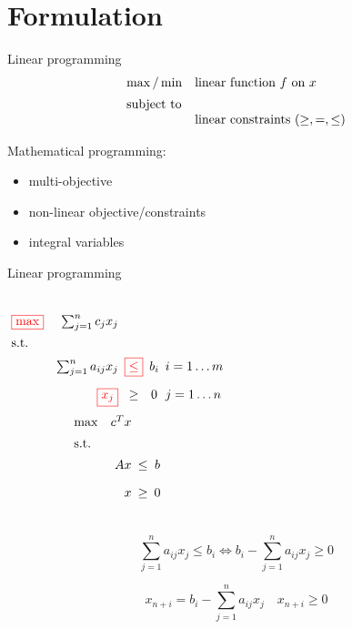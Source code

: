 \section{Formulation}

\begin{frame}{Linear programming}
  \begin{equation*}
	\setlength\arraycolsep{2.5pt}
	\begin{array}{l@{\quad}l}
	  \max/\min 	& \text{linear function } f \text{ on } x	\\[5pt]
	  \text{subject to} 	&	\\
					&	\text{linear constraints } (\geq, =, \leq)
	\end{array}
  \end{equation*}

  \vspace{0.80cm}

  Mathematical programming:
  \begin{itemize}
	\item multi-objective
	\item non-linear objective/constraints
	\item integral variables
  \end{itemize}
\end{frame}
\begin{frame}{Linear programming}
  \begin{columns}
	  \begin{equation*}
		\setlength\arraycolsep{2.5pt}
		\begin{array}{l@{\quad}rccl}
		  \red{\boxed{\max}} 	& \sum_{j=1}^{n} c_j x_j 	&	&	&	\\[5pt]
		  \text{s.t.} 	&	&	&	&	\\[5pt]
		  &	\sum_{j=1}^{n} a_{ij} x_j &	\red{\boxed{\leq}}	&	b_i	&	i = 1 \dots m \\[10pt]
		  &	\red{\boxed{x_j}} 		& \geq 	&	0	&	j = 1 \dots n
		\end{array}
	  \end{equation*}
	  \begin{equation*}
		\setlength\arraycolsep{2.5pt}
		\begin{array}{l@{\quad}rcc}
		  \max 	& c^{T}x	&	&	\\[5pt]
		  \text{s.t.} 	&	&	&	\\[5pt]
				&	Ax 	&	\leq	&	b	\\[10pt]
				&	x	& 	\geq 	&	0	
		\end{array}
	  \end{equation*}
  \end{columns}

  \vspace{0.50cm}

  \[
	\sum_{j=1}^{n} a_{ij} x_j \leq b_i	\iff b_i - \sum_{j=1}^{n} a_{ij} x_j \geq 0
  \]

  \[
	x_{n+i} = b_i - \sum_{j=1}^{n} a_{ij} x_j \quad x_{n+i} \geq 0
  \]
\end{frame}
